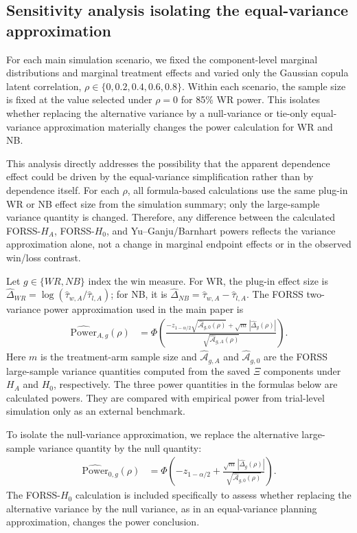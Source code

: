 \subsection{Sensitivity analysis isolating the equal-variance approximation}\label{app:equal_variance_sensitivity}

For each main simulation scenario, we fixed the component-level marginal distributions and marginal treatment effects and varied only the Gaussian copula latent correlation, $\rho\in\{0,0.2,0.4,0.6,0.8\}$. Within each scenario, the sample size is fixed at the value selected under $\rho=0$ for 85\% WR power. This isolates whether replacing the alternative variance by a null-variance or tie-only equal-variance approximation materially changes the power calculation for WR and NB.

This analysis directly addresses the possibility that the apparent dependence effect could be driven by the equal-variance simplification rather than by dependence itself. For each $\rho$, all formula-based calculations use the same plug-in WR or NB effect size from the simulation summary; only the large-sample variance quantity is changed. Therefore, any difference between the calculated FORSS-$H_A$, FORSS-$H_0$, and Yu--Ganju/Barnhart powers reflects the variance approximation alone, not a change in marginal endpoint effects or in the observed win/loss contrast.

Let $g\in\{WR,NB\}$ index the win measure. For WR, the plug-in effect size is $\widehat{\Delta}_{WR}=\log(\widehat{\tau}_{w,A}/\widehat{\tau}_{l,A})$; for NB, it is $\widehat{\Delta}_{NB}=\widehat{\tau}_{w,A}-\widehat{\tau}_{l,A}$. The FORSS two-variance power approximation used in the main paper is
\begin{align*}
\widehat{\mathrm{Power}}_{A,g}(\rho)
&=
\Phi \left(
\frac{-z_{1-\alpha/2}\sqrt{\widehat{\mathcal A}_{g,0}(\rho)} + \sqrt{m}\,|\widehat{\Delta}_g(\rho)|}
{\sqrt{\widehat{\mathcal A}_{g,A}(\rho)}}
\right).
\end{align*}
Here $m$ is the treatment-arm sample size and $\widehat{\mathcal A}_{g,A}$ and $\widehat{\mathcal A}_{g,0}$ are the FORSS large-sample variance quantities computed from the saved $\Xi$ components under $H_A$ and $H_0$, respectively.
The three power quantities in the formulas below are calculated powers. They are compared with empirical power from trial-level simulation only as an external benchmark.

To isolate the null-variance approximation, we replace the alternative large-sample variance quantity by the null quantity:
\begin{align*}
\widehat{\mathrm{Power}}_{0,g}(\rho)
&=
\Phi \left(
-z_{1-\alpha/2}
+
\frac{\sqrt{m}\,|\widehat{\Delta}_g(\rho)|}
{\sqrt{\widehat{\mathcal A}_{g,0}(\rho)}}
\right).
\end{align*}
The FORSS-$H_0$ calculation is included specifically to assess whether replacing the alternative variance by the null variance, as in an equal-variance planning approximation, changes the power conclusion.

